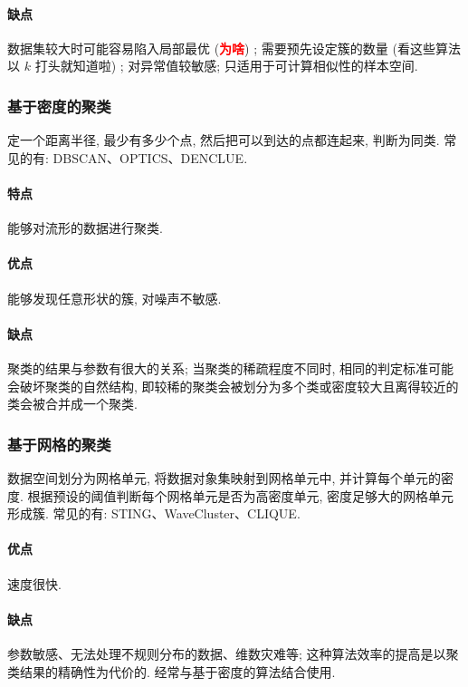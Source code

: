\paragraph{缺点}数据集较大时可能容易陷入局部最优 (\textcolor{red}{\textbf{为啥}}) ; 需要预先设定簇的数量 (看这些算法以 $k$ 打头就知道啦) ; 对异常值较敏感; 只适用于可计算相似性的样本空间. 
	
\subsubsection{基于密度的聚类}
定一个距离半径, 最少有多少个点, 然后把可以到达的点都连起来, 判断为同类. 常见的有: DBSCAN、OPTICS、DENCLUE. 

\paragraph{特点}能够对流形的数据进行聚类. 
	
\paragraph{优点}能够发现任意形状的簇, 对噪声不敏感. 

\paragraph{缺点}聚类的结果与参数有很大的关系; 当聚类的稀疏程度不同时, 相同的判定标准可能会破坏聚类的自然结构, 即较稀的聚类会被划分为多个类或密度较大且离得较近的类会被合并成一个聚类. 
	
\subsubsection{基于网格的聚类}
数据空间划分为网格单元, 将数据对象集映射到网格单元中, 并计算每个单元的密度. 根据预设的阈值判断每个网格单元是否为高密度单元, 密度足够大的网格单元形成簇. 常见的有: STING、WaveCluster、CLIQUE. 

\paragraph{优点}速度很快. 

\paragraph{缺点}参数敏感、无法处理不规则分布的数据、维数灾难等; 这种算法效率的提高是以聚类结果的精确性为代价的. 经常与基于密度的算法结合使用. 
	
